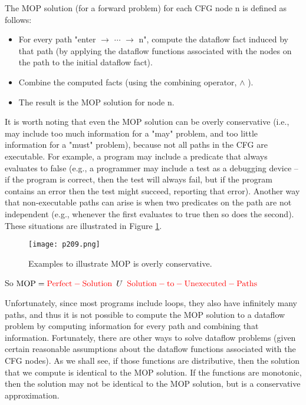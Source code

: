 The MOP solution (for a forward problem) for each CFG node n is defined as follows:


\begin{itemize}
	\item For every path "enter $\rightarrow$  $\cdots$  $\rightarrow$ n", compute the dataflow fact induced by that path
	      (by applying the dataflow functions associated with the nodes on the path to the initial dataflow fact).
	\item Combine the computed facts (using the combining operator, $\wedge $ ).
	\item The result is the MOP solution for node n.

\end{itemize}


It is worth noting that even the MOP solution can be overly conservative
(i.e., may include too much information for a "may" problem, and too little information for a "must" problem),
because not all paths in the CFG are executable. For example, a program may include a predicate that always evaluates to false
(e.g., a programmer may include a test as a debugging device -- if the program is correct, then the test will always fail,
but if the program contains an error then the test might succeed, reporting that error). Another way that non-executable paths
can arise is when two predicates on the path are not independent (e.g., whenever the first evaluates to true then so does the second).
These situations are illustrated in Figure \ref{fig:p209}.



\begin{figure}[H]
	\centering
	\texttt{[image: p209.png]}
	\caption{Examples to illustrate MOP is overly conservative.}
	\label{fig:p209}
\end{figure}




So $\mathrm{MOP} = {\color{red}\mathrm{Perfect-Solution   }} \,\,\,U\,\,\, {\color{red}\mathrm{   Solution-to-Unexecuted-Paths}}$

Unfortunately, since most programs include loops, they also have infinitely many paths, and thus it is not possible to
compute the MOP solution to a dataflow problem by computing information for every path and combining that information. Fortunately,
there are other ways to solve dataflow problems (given certain reasonable assumptions about the dataflow functions associated with
the CFG nodes). As we shall see, if those functions are distributive, then the solution that we compute is identical to the MOP
solution. If the functions are monotonic, then the solution may not be identical to the MOP solution, but is a conservative
approximation.

